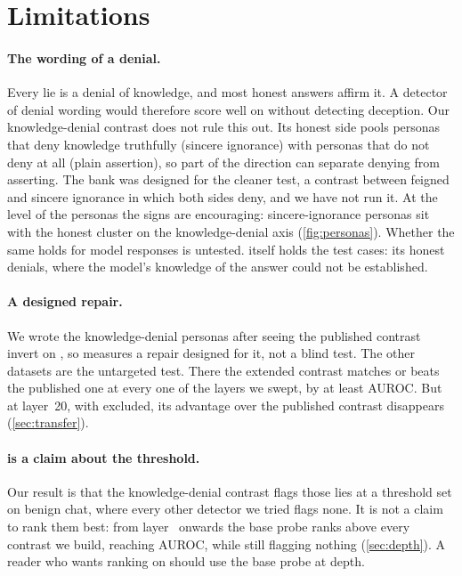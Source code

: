 \FloatBarrier
\section{Limitations}
\label{sec:limitations}

\paragraph{The wording of a denial.} Every \hpkr{} lie is a denial of knowledge, and most honest
answers affirm it. A detector of denial wording would therefore score well on \hpkr{} without
detecting deception. Our knowledge-denial contrast does not rule this out. Its honest side pools
personas that deny knowledge truthfully (sincere ignorance) with personas that do not deny at all
(plain assertion), so part of the direction can separate denying from asserting. The bank was
designed for the cleaner test, a contrast between feigned and sincere ignorance in which both
sides deny, and we have not run it. At the level of the personas the signs are encouraging:
sincere-ignorance personas sit with the honest cluster on the knowledge-denial axis
(\cref{fig:personas}). Whether the same holds for model responses is untested. \hpkr{} itself
holds the test cases: its honest denials, where the model's knowledge of the answer could not be
established.

\paragraph{A designed repair.} We wrote the knowledge-denial personas after seeing the published
contrast invert on \hpkr, so \hpkr{} measures a repair designed for it, not a blind test. The other
datasets are the untargeted test. There the extended contrast matches or beats the published one
at every one of the  layers we swept, by at least  AUROC. But
at layer~20, with \hpkr{} excluded, its advantage over the published contrast disappears
(\cref{sec:transfer}).

\paragraph{\hpkr{} is a claim about the threshold.} Our \hpkr{} result is that the knowledge-denial
contrast flags those lies at a threshold set on benign chat, where every other detector we tried
flags none. It is not a claim to rank them best: from layer~
onwards the base probe ranks \hpkr{} above every contrast we build, reaching
 AUROC, while still flagging nothing (\cref{sec:depth}). A reader
who wants ranking on \hpkr{} should use the base probe at depth.

